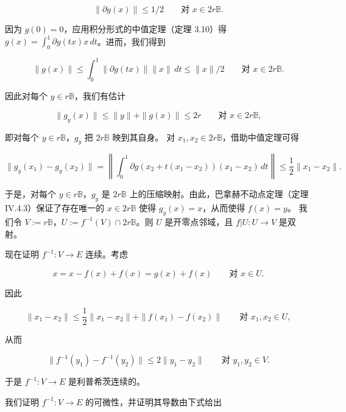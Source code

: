 \begin{theorem}
\begin{subitems}
\begin{equation}
\|\partial g(x)\| \le 1/2 \qquad \text{对 } x \in 2r\mathbb{B} .\tag{7.7}
\end{equation}

因为 $ g(0) = 0 $，应用积分形式的中值定理（定理 3.10）得 $ g(x) = \int_{0}^{1}\partial g(tx)x\,dt $。进而，我们得到

\begin{equation}
\|g(x)\| \le \int_{0}^{1}\|\partial g(tx)\|\|x\|\,dt \le \|x\|/2 \qquad \text{对 } x \in 2r\mathbb{B} .\tag{7.8}
\end{equation}

因此对每个 $ y \in r\mathbb{B} $，我们有估计

\[
\|g_{y}(x)\| \le \|y\| + \|g(x)\| \le 2r \qquad \text{对 } x \in 2r\mathbb{B} ,
\]

即对每个 $ y \in r\mathbb{B} $，$ g_{y} $ 把 $ 2r\mathbb{B} $ 映到其自身。
对 $ x_{1}, x_{2} \in 2r\mathbb{B} $，借助中值定理可得

\[
\|g_{y}(x_{1}) - g_{y}(x_{2})\| = \left\|\int_{0}^{1}\partial g\left(x_{2} + t(x_{1} - x_{2})\right)(x_{1} - x_{2})\,dt\right\| \le \frac{1}{2}\|x_{1} - x_{2}\| .
\]

于是，对每个 $ y \in r\mathbb{B} $，$ g_{y} $ 是 $ 2r\mathbb{B} $ 上的压缩映射。由此，巴拿赫不动点定理（定理 IV.4.3）保证了存在唯一的 $ x \in 2r\mathbb{B} $ 使得 $ g_{y}(x) = x $，从而使得 $ f(x) = y $。
我们令 $ V := r\mathbb{B} $，$ U := f^{-1}(V) \cap 2r\mathbb{B} $。则 $ U $ 是开零点邻域，且 $ f|U : U \to V $ 是双射。

\item[（iv）]

现在证明 $ f^{-1} : V \to E $ 连续。考虑

\[
x = x - f(x) + f(x) = g(x) + f(x) \qquad \text{对 } x \in U .
\]

因此

\[
\|x_{1} - x_{2}\| \le \frac{1}{2}\|x_{1} - x_{2}\| + \|f(x_{1}) - f(x_{2})\| \qquad \text{对 } x_{1}, x_{2} \in U ,
\]

从而

\begin{equation}
\|f^{-1}(y_{1}) - f^{-1}(y_{2})\| \le 2\|y_{1} - y_{2}\| \qquad \text{对 } y_{1}, y_{2} \in V .\tag{7.9}
\end{equation}

于是 $ f^{-1} : V \to E $ 是利普希茨连续的。

\item[（v）]

我们证明 $ f^{-1} : V \to E $ 的可微性，并证明其导数由下式给出


\end{subitems}
\end{theorem}
